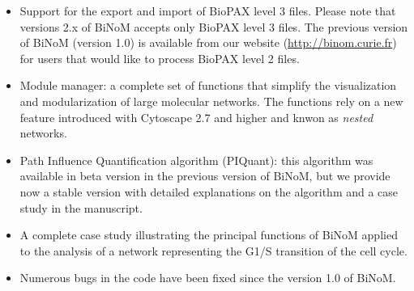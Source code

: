 \documentclass[a4paper,10pt]{article}
\begin{document}
\begin{itemize}
 \item Support for the export and import of BioPAX level 3 files. Please note
that versions 2.x of BiNoM accepts only BioPAX level 3 files. The previous
version of BiNoM (version 1.0) is available from our website
(\url{http://binom.curie.fr}) for users that would like to process BioPAX level
2 files.

 \item Module manager: a complete set of functions that simplify the
visualization and modularization of large molecular networks. The functions rely
on a new feature introduced with Cytoscape 2.7 and higher and knwon as
\textit{nested} networks.

 \item Path Influence Quantification algorithm (PIQuant): this algorithm was
available in beta version in the previous version of BiNoM, but we provide now a
stable version with detailed explanations on the algorithm and a case study in
the manuscript.

  \item A complete case study illustrating the principal functions of BiNoM applied to the analysis of a network representing the G1/S transition of the cell cycle.

  \item Numerous bugs in the code have been fixed since the version 1.0 of BiNoM.

\end{itemize}
\end{document}
